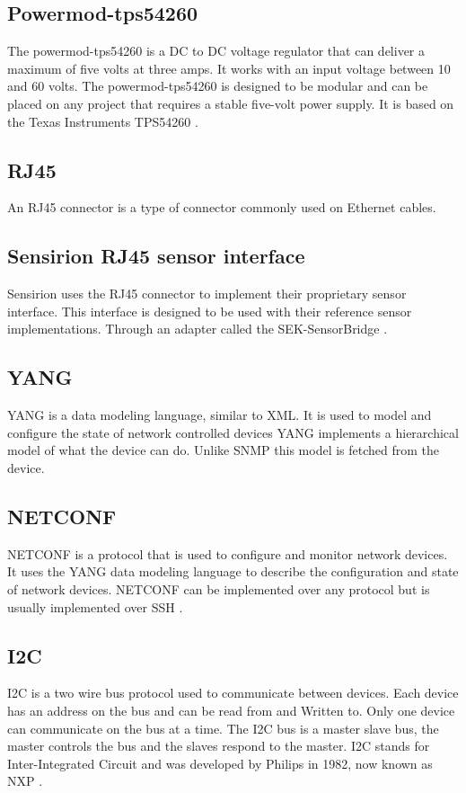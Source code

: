 \documentclass[12pt]{article}
\begin{document}
\subsection{Powermod-tps54260}
The powermod-tps54260 is a DC to DC voltage regulator that can deliver a maximum of five volts at three amps.
It works with an input voltage between 10 and 60 volts. The powermod-tps54260 is designed to be modular and
can be placed on any project that requires a stable five-volt power supply. It is based on the Texas Instruments TPS54260 \cite{TPS54260DataSheet}.


\subsection{RJ45}
An RJ45 connector is a type of connector commonly used on Ethernet cables.

\subsection{Sensirion RJ45 sensor interface}
Sensirion uses the RJ45 connector to implement their proprietary sensor interface.
This interface is designed to be used with their reference sensor implementations. Through 
an adapter called the SEK-SensorBridge \cite{agSEKSensorBridgeConnectingBridgeTwo}.

\subsection{YANG}
YANG is a data modeling language, similar to XML. It is used to model and configure the state of network controlled devices \cite{bjorklundYANG11Data2016}
YANG implements a hierarchical model of what the device can do. Unlike SNMP this model is fetched from the device.

\subsection{NETCONF}
NETCONF is a protocol that is used to configure and monitor network devices. It uses the YANG data modeling language to describe the configuration and state of network devices.
NETCONF can be implemented over any protocol but is usually implemented over SSH \cite{ennsNetworkConfigurationProtocol2011}.

\subsection{I2C}
I2C is a two wire bus protocol used to communicate between devices. Each device has an address on the bus and can be read from and Written to.
Only one device can communicate on the bus at a time. The I2C bus is a master slave bus, the master controls the bus and the slaves respond to the master.
I2C stands for Inter-Integrated Circuit and was developed by Philips in 1982, now known as NXP \cite{I2CbusSpecificationUser2021}.
\end{document}
